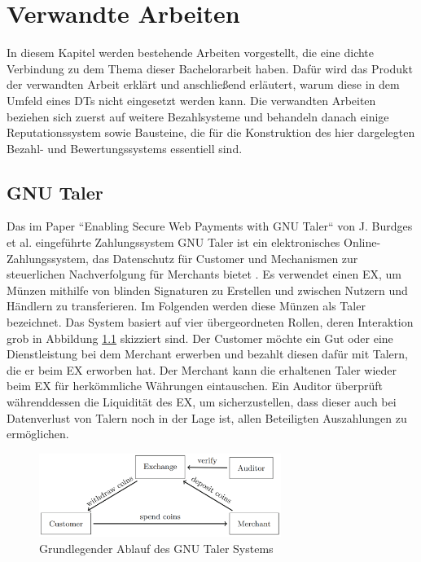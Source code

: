 \documentclass[
	fontsize=11pt,
	headings=small,
	parskip=half,           %
	bibliography=totoc,
	numbers=noenddot,       %
	open=any,               %
]{scrreprt}
\begin{document}
\chapter{Verwandte Arbeiten}
In diesem Kapitel werden bestehende Arbeiten vorgestellt, die eine dichte Verbindung zu dem Thema dieser Bachelorarbeit haben. Dafür wird das Produkt der verwandten Arbeit erklärt und anschließend erläutert, warum diese in dem Umfeld eines DTs nicht eingesetzt werden kann. Die verwandten Arbeiten beziehen sich zuerst auf weitere Bezahlsysteme und behandeln danach einige Reputationssystem sowie Bausteine, die für die Konstruktion des hier dargelegten Bezahl- und Bewertungssystems essentiell sind.

\section{GNU Taler}
\label{subsec:gnu}
Das im Paper ``Enabling Secure Web Payments with GNU Taler`` von J. Burdges et al. eingeführte Zahlungssystem GNU Taler ist ein elektronisches Online-Zahlungssystem, das Datenschutz für Customer und Mechanismen zur steuerlichen Nachverfolgung für Merchants bietet \cite{gnu-burdges2016enabling}. Es verwendet einen EX, um Münzen mithilfe von blinden Signaturen zu Erstellen und zwischen Nutzern und Händlern zu transferieren. Im Folgenden werden diese Münzen als Taler bezeichnet. Das System basiert auf vier übergeordneten Rollen, deren Interaktion grob in Abbildung \ref{fig:gnu_taler_overview} skizziert sind. Der Customer möchte ein Gut oder eine Dienstleistung bei dem Merchant erwerben und bezahlt diesen dafür mit Talern, die er beim EX erworben hat. Der Merchant kann die erhaltenen Taler wieder beim EX für herkömmliche Währungen eintauschen. Ein Auditor überprüft währenddessen die Liquidität des EX, um sicherzustellen, dass dieser auch bei Datenverlust von Talern noch in der Lage ist, allen Beteiligten Auszahlungen zu ermöglichen.

\begin{figure}[H]
    \centering
    \includegraphics[width=0.7\textwidth]{gnu_system_graphic.png}
    \caption{Grundlegender Ablauf des GNU Taler Systems \cite{gnu-burdges2016enabling}}
    \label{fig:gnu_taler_overview}
\end{figure}
\end{document}
